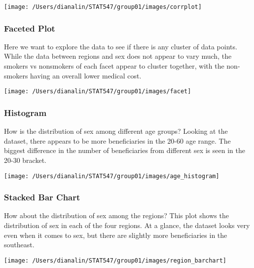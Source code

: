 \documentclass[]{article}
\begin{document}
\begin{center}\texttt{[image: /Users/dianalin/STAT547/group01/images/corrplot]} \end{center}

\hypertarget{faceted-plot}{%
\subsubsection{Faceted Plot}\label{faceted-plot}}

Here we want to explore the data to see if there is any cluster of data
points. While the data between regions and sex does not appear to vary
much, the smokers vs nonsmokers of each facet appear to cluster
together, with the non-smokers having an overall lower medical cost.

\begin{center}\texttt{[image: /Users/dianalin/STAT547/group01/images/facet]} \end{center}

\hypertarget{histogram}{%
\subsubsection{Histogram}\label{histogram}}

How is the distribution of sex among different age groups? Looking at
the dataset, there appears to be more beneficiaries in the 20-60 age
range. The biggest difference in the number of beneficiaries from
different sex is seen in the 20-30 bracket.

\begin{center}\texttt{[image: /Users/dianalin/STAT547/group01/images/age\_histogram]} \end{center}

\hypertarget{stacked-bar-chart}{%
\subsubsection{Stacked Bar Chart}\label{stacked-bar-chart}}

How about the distribution of sex among the regions? This plot shows the
distribution of sex in each of the four regions. At a glance, the
dataset looks very even when it comes to sex, but there are slightly
more beneficiaries in the southeast.

\begin{center}\texttt{[image: /Users/dianalin/STAT547/group01/images/region\_barchart]} \end{center}
\end{document}
